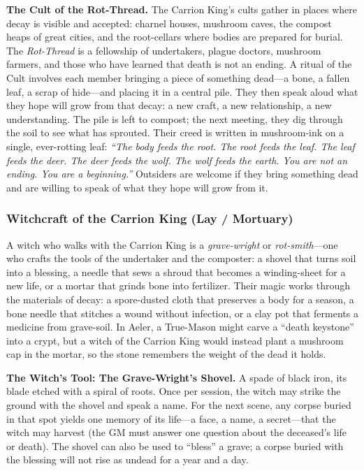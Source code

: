 \textbf{The Cult of the Rot-Thread.} The Carrion King's cults gather in places where decay is visible and accepted: charnel houses, mushroom caves, the compost heaps of great cities, and the root-cellars where bodies are prepared for burial. The \textit{Rot-Thread} is a fellowship of undertakers, plague doctors, mushroom farmers, and those who have learned that death is not an ending. A ritual of the Cult involves each member bringing a piece of something dead---a bone, a fallen leaf, a scrap of hide---and placing it in a central pile. They then speak aloud what they hope will grow from that decay: a new craft, a new relationship, a new understanding. The pile is left to compost; the next meeting, they dig through the soil to see what has sprouted. Their creed is written in mushroom-ink on a single, ever-rotting leaf: \textit{``The body feeds the root. The root feeds the leaf. The leaf feeds the deer. The deer feeds the wolf. The wolf feeds the earth. You are not an ending. You are a \textit{beginning}.''} Outsiders are welcome if they bring something dead and are willing to speak of what they hope will grow from it.

\subsubsection*{Witchcraft of the Carrion King (Lay / Mortuary)}

A witch who walks with the Carrion King is a \textit{grave-wright} or \textit{rot-smith}---one who crafts the tools of the undertaker and the composter: a shovel that turns soil into a blessing, a needle that sews a shroud that becomes a winding-sheet for a new life, or a mortar that grinds bone into fertilizer. Their magic works through the materials of decay: a spore-dusted cloth that preserves a body for a season, a bone needle that stitches a wound without infection, or a clay pot that ferments a medicine from grave-soil. In Aeler, a True-Mason might carve a ``death keystone'' into a crypt, but a witch of the Carrion King would instead plant a mushroom cap in the mortar, so the stone remembers the weight of the dead it holds.

\textbf{The Witch's Tool: The Grave-Wright's Shovel.} A spade of black iron, its blade etched with a spiral of roots. Once per session, the witch may strike the ground with the shovel and speak a name. For the next scene, any corpse buried in that spot yields one memory of its life---a face, a name, a secret---that the witch may harvest (the GM must answer one question about the deceased's life or death). The shovel can also be used to ``bless'' a grave; a corpse buried with the blessing will not rise as undead for a year and a day.

